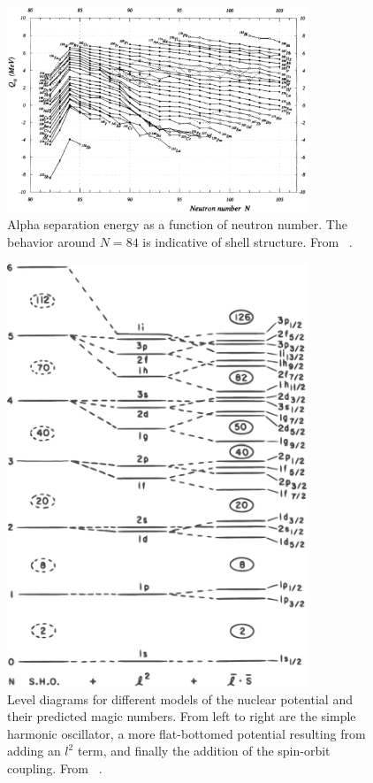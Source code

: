 \begin{figure}[hp]
\centering
\includegraphics[width=0.8\textwidth]{figures/alphaSepEnergy.eps}
\caption[Alpha separation energy as an illustration of shell structure.]{Alpha separation energy as a function of neutron number.  The behavior around $N=84$ is indicative of shell structure.  From {}~\citep{massEval_1993}.}
\label{fig:alphaSep}
\end{figure}
\begin{figure}[hp]
\centering
\includegraphics[width=0.8\textwidth]{figures/nuclearLevels.eps}
\caption[Level diagrams for different models of the nuclear Hamiltonian.]{Level diagrams for different models of the nuclear potential and their predicted magic numbers.  From left to right are the simple harmonic oscillator, a more flat-bottomed potential resulting from adding an $l^2$ term, and finally the addition of the spin-orbit coupling.  From {}~\citep{Casten}.}
\label{fig:shellModelMagic}
\end{figure}

